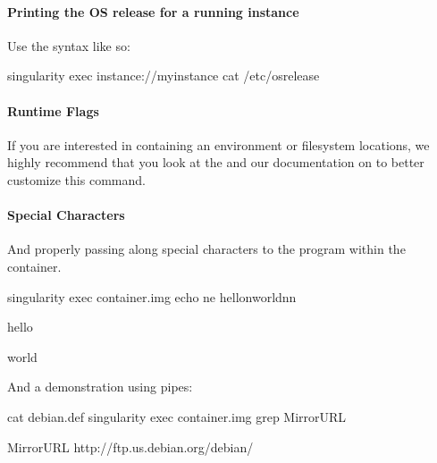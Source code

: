 \documentclass[letterpaper,10pt,english]{sphinxmanual}
\begin{document}
\paragraph{Printing the OS release for a running instance}
\label{\detokenize{appendix:printing-the-os-release-for-a-running-instance}}
Use the  syntax like so:

%
\begin{sphinxVerbatim}[commandchars=\\\{\}]
\PYGZdl{} singularity exec instance://my\PYGZhy{}instance cat /etc/os\PYGZhy{}release
\end{sphinxVerbatim}


\paragraph{Runtime Flags}
\label{\detokenize{appendix:runtime-flags}}
If you are interested in containing an environment or filesystem
locations, we highly recommend that you look at the  and our
documentation on {\hyperref[\detokenize{appendix:singularity-action-flags}]{}} to better customize this command.


\paragraph{Special Characters}
\label{\detokenize{appendix:special-characters}}
And properly passing along special characters to the program within the
container.

%
\begin{sphinxVerbatim}[commandchars=\\\{\}]
\PYGZdl{} singularity exec container.img echo \PYGZhy{}ne \PYGZdq{}hello\PYGZbs{}nworld\PYGZbs{}n\PYGZbs{}n\PYGZdq{}

hello

world

\PYGZdl{}
\end{sphinxVerbatim}

And a demonstration using pipes:

%
\begin{sphinxVerbatim}[commandchars=\\\{\}]
\PYGZdl{} cat debian.def \textbar{} singularity exec container.img grep \PYGZsq{}MirrorURL\PYGZsq{}

MirrorURL \PYGZdq{}http://ftp.us.debian.org/debian/\PYGZdq{}

\PYGZdl{}
\end{sphinxVerbatim}
\end{document}
